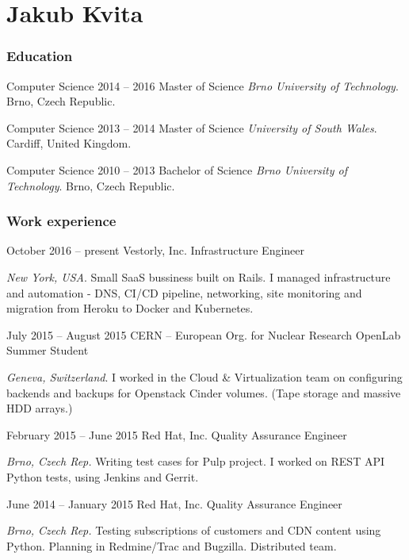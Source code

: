 \documentclass{tccv}
\begin{document}
\part{Jakub Kvita}

\section{Education}

\begin{yearlist}
	
	\item[Computer Science]{2014 -- 2016}
	{Master of Science}
	{\emph{Brno University of Technology}. Brno, Czech Republic.}
	
	\item[Computer Science]{2013 -- 2014}
	{Master of Science}
	{\emph{University of South Wales}. Cardiff, United Kingdom.}
	
	\item[Computer Science]{2010 -- 2013}
	{Bachelor of Science}
	{\emph{Brno University of Technology}. Brno, Czech Republic.}
	
\end{yearlist}

\section{Work experience}

\begin{eventlist}

\item{October 2016 -- present}
{Vestorly, Inc.}
{Infrastructure Engineer}

\emph{New York, USA}. Small SaaS bussiness built on Rails. I managed infrastructure and automation - DNS, CI/CD pipeline, networking, site monitoring and migration from Heroku to Docker and Kubernetes.

\item{July 2015 -- August 2015}
     {CERN -- European Org. for Nuclear Research}
     {OpenLab Summer Student}

\emph{Geneva, Switzerland}. I worked in the Cloud \& Virtualization team on configuring backends and backups for Openstack Cinder volumes. (Tape storage and massive HDD arrays.)

\item{February 2015 -- June 2015}
     {Red Hat, Inc.}
     {Quality Assurance Engineer}

\emph{Brno, Czech Rep.} Writing test cases for Pulp project. I worked on REST API Python tests, using Jenkins and Gerrit.

\item{June 2014 -- January 2015}
     {Red Hat, Inc.}
     {Quality Assurance Engineer}

\emph{Brno, Czech Rep.} Testing subscriptions of customers and CDN content using Python. Planning in Redmine/Trac and Bugzilla. Distributed team.

\end{eventlist}
\end{document}
